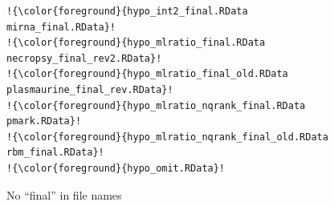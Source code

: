 \documentclass[aspectratio=169,12pt,t]{beamer}
\begin{document}
\begin{frame}
\begin{center}
\begin{minipage}[c]{9.5cm}
\begin{semiverbatim}
\begin{lstlisting}[escapechar=!,linewidth=9.5cm]
!{\color{foreground}{hypo_int2_final.RData                  mirna_final.RData}!
!{\color{foreground}{hypo_mlratio_final.RData               necropsy_final_rev2.RData}!
!{\color{foreground}{hypo_mlratio_final_old.RData           plasmaurine_final_rev.RData}!
!{\color{foreground}{hypo_mlratio_nqrank_final.RData        pmark.RData}!
!{\color{foreground}{hypo_mlratio_nqrank_final_old.RData    rbm_final.RData}!
!{\color{foreground}{hypo_omit.RData}!
\end{lstlisting}
\end{semiverbatim}
\end{minipage}
\end{center}



\end{frame}


\begin{frame}[fragile,c]{No ``{\hilit final}'' in file names}



\end{frame}
\end{document}
